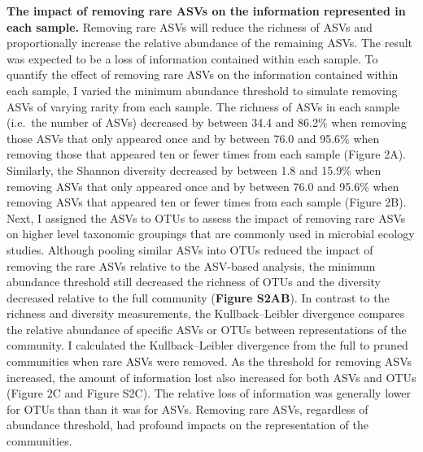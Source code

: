 \documentclass[]{article}
\begin{document}
\textbf{The impact of removing rare ASVs on the information represented
in each sample.} Removing rare ASVs will reduce the richness of ASVs and
proportionally increase the relative abundance of the remaining ASVs.
The result was expected to be a loss of information contained within
each sample. To quantify the effect of removing rare ASVs on the
information contained within each sample, I varied the minimum abundance
threshold to simulate removing ASVs of varying rarity from each sample.
The richness of ASVs in each sample (i.e.~the number of ASVs) decreased
by between 34.4 and 86.2\% when removing those ASVs that only appeared
once and by between 76.0 and 95.6\% when removing those that appeared
ten or fewer times from each sample (Figure 2A). Similarly, the Shannon
diversity decreased by between 1.8 and 15.9\% when removing ASVs that
only appeared once and by between 76.0 and 95.6\% when removing ASVs
that appeared ten or fewer times from each sample (Figure 2B). Next, I
assigned the ASVs to OTUs to assess the impact of removing rare ASVs on
higher level taxonomic groupings that are commonly used in microbial
ecology studies. Although pooling similar ASVs into OTUs reduced the
impact of removing the rare ASVs relative to the ASV-based analysis, the
minimum abundance threshold still decreased the richness of OTUs and the
diversity decreased relative to the full community (\textbf{Figure
S2AB}). In contrast to the richness and diversity measurements, the
Kullback--Leibler divergence compares the relative abundance of specific
ASVs or OTUs between representations of the community. I calculated the
Kullback--Leibler divergence from the full to pruned communities when
rare ASVs were removed. As the threshold for removing ASVs increased,
the amount of information lost also increased for both ASVs and OTUs
(Figure 2C and Figure S2C). The relative loss of information was
generally lower for OTUs than than it was for ASVs. Removing rare ASVs,
regardless of abundance threshold, had profound impacts on the
representation of the communities.
\end{document}
